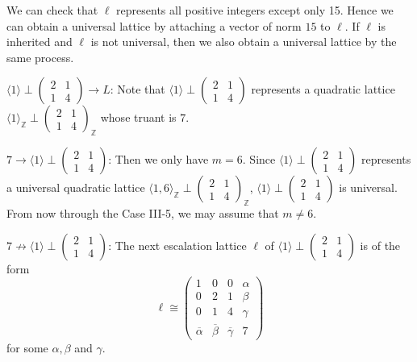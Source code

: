 \documentclass[a4paper,10pt,reqno]{amsart}
\begin{document}
\noindent We can check that $\ell$ represents all positive integers except only 15. Hence we can
obtain a universal lattice by attaching a vector of norm $15$ to $\ell$. If $\ell$ is inherited and
$\ell$ is not universal, then we also obtain a universal lattice by the same process.

{} ${\langle {1} \rangle}\perp{\begin{pmatrix}
  2 & 1 \\
  1 & 4
\end{pmatrix}} \to L$: Note that ${\langle {1} \rangle}\perp{\begin{pmatrix}
  2 & 1 \\
  1 & 4
\end{pmatrix}}$ represents
a quadratic lattice ${\langle {1} \rangle}_{\mathbb{Z}}\perp{\begin{pmatrix}
  2 & 1 \\
  1 & 4
\end{pmatrix}}_{\mathbb{Z}}$ whose truant is $7$.

{} $7 \to {\langle {1} \rangle}\perp{\begin{pmatrix}
  2 & 1 \\
  1 & 4
\end{pmatrix}}$: Then we only have $m=6$. Since
${\langle {1} \rangle}\perp{\begin{pmatrix}
  2 & 1 \\
  1 & 4
\end{pmatrix}}$ represents a universal quadratic lattice ${\langle {1,6} \rangle}_{\mathbb{Z}} \perp
{\begin{pmatrix}
  2 & 1 \\
  1 & 4
\end{pmatrix}}_{\mathbb{Z}}$, ${\langle {1} \rangle}\perp{\begin{pmatrix}
  2 & 1 \\
  1 & 4
\end{pmatrix}}$ is universal. From now through the Case III-5, we
may assume that $m \ne 6$.

{} $7 \not\to {\langle {1} \rangle}\perp{\begin{pmatrix}
  2 & 1 \\
  1 & 4
\end{pmatrix}}$: The next escalation lattice $\ell$ of
${\langle {1} \rangle}\perp{\begin{pmatrix}
  2 & 1 \\
  1 & 4
\end{pmatrix}}$ is of the form
\[ \ell \cong
    \begin{pmatrix}
        1 & 0 & 0 & \alpha \\
        0 & 2 & 1 & \beta \\
        0 & 1 & 4 & \gamma \\
        {\overline{{\alpha}}} & {\overline{{\beta}}} & {\overline{{\gamma}}} & 7
    \end{pmatrix}
\]
for some $\alpha, \beta$ and $\gamma$.
\end{document}
